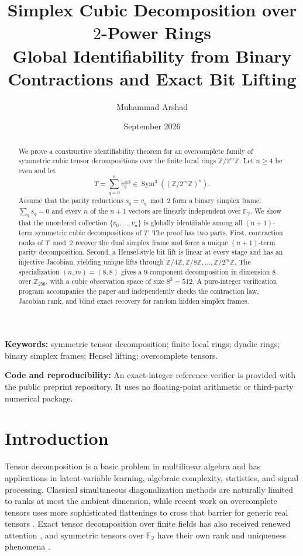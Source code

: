 \documentclass[11pt]{article}
\title{\textbf{Simplex Cubic Decomposition over $2$-Power Rings}\\
Global Identifiability from Binary Contractions and Exact Bit Lifting}
\author{Muhammad Arshad}
\date{September 2026}
\theoremstyle{definition}
\newcommand{\F}{\mathbb{F}}
\newcommand{\Z}{\mathbb{Z}}
\newcommand{\Sym}{\operatorname{Sym}}
\begin{document}
\maketitle

\begin{abstract}
We prove a constructive identifiability theorem for an overcomplete family of symmetric cubic tensor decompositions over the finite local rings $\Z/2^m\Z$. Let $n\ge 4$ be even and let
\[
T=\sum_{q=0}^{n} v_q^{\otimes 3}\in \Sym^3\!\left((\Z/2^m\Z)^n\right).
\]
Assume that the parity reductions $s_q=v_q\bmod 2$ form a binary simplex frame: $\sum_q s_q=0$ and every $n$ of the $n+1$ vectors are linearly independent over $\F_2$. We show that the unordered collection $\{v_0,\ldots,v_n\}$ is globally identifiable among all $(n+1)$-term symmetric cubic decompositions of $T$. The proof has two parts. First, contraction ranks of $T\bmod 2$ recover the dual simplex frame and force a unique $(n+1)$-term parity decomposition. Second, a Hensel-style bit lift is linear at every stage and has an injective Jacobian, yielding unique lifts through $\Z/4\Z,\Z/8\Z,\ldots,\Z/2^m\Z$. The specialization $(n,m)=(8,8)$ gives a $9$-component decomposition in dimension $8$ over $\Z_{256}$, with a cubic observation space of size $8^3=512$. A pure-integer verification program accompanies the paper and independently checks the contraction law, Jacobian rank, and blind exact recovery for random hidden simplex frames.
\end{abstract}

\noindent\textbf{Keywords:} symmetric tensor decomposition; finite local rings; dyadic rings; binary simplex frames; Hensel lifting; overcomplete tensors.

\medskip
\noindent\textbf{Code and reproducibility:} An exact-integer reference verifier is provided with the public preprint repository. It uses no floating-point arithmetic or third-party numerical package.

\section{Introduction}
Tensor decomposition is a basic problem in multilinear algebra and has applications in latent-variable learning, algebraic complexity, statistics, and signal processing. Classical simultaneous diagonalization methods are naturally limited to ranks at most the ambient dimension, while recent work on overcomplete tensors uses more sophisticated flattenings to cross that barrier for generic real tensors \cite{KothariMoitraWein2025}. Exact tensor decomposition over finite fields has also received renewed attention \cite{Yang2025,CotardoZullo2026}, and symmetric tensors over $\F_2$ have their own rank and uniqueness phenomena \cite{SongZhengHuang2022}.
\end{document}
